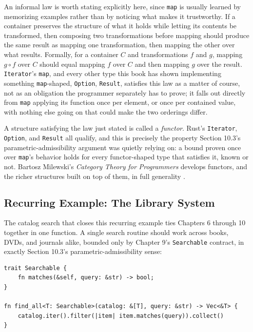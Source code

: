 \documentclass[11pt]{book}
\begin{document}
An informal law is worth stating explicitly here, since \texttt{map} is usually learned by memorizing examples rather than by noticing what makes it trustworthy. If a container preserves the structure of what it holds while letting its contents be transformed, then composing two transformations before mapping should produce the same result as mapping one transformation, then mapping the other over what results. Formally, for a container $C$ and transformations $f$ and $g$, mapping $g \circ f$ over $C$ should equal mapping $f$ over $C$ and then mapping $g$ over the result. \texttt{Iterator}'s \texttt{map}, and every other type this book has shown implementing something \texttt{map}-shaped, \texttt{Option}, \texttt{Result}, satisfies this law as a matter of course, not as an obligation the programmer separately has to prove; it falls out directly from \texttt{map} applying its function once per element, or once per contained value, with nothing else going on that could make the two orderings differ.

\begin{categorybox}
A structure satisfying the law just stated is called a \emph{functor}. Rust's \texttt{Iterator}, \texttt{Option}, and \texttt{Result} all qualify, and this is precisely the property Section 10.3's parametric-admissibility argument was quietly relying on: a bound proven once over \texttt{map}'s behavior holds for every functor-shaped type that satisfies it, known or not. Bartosz Milewski's \textit{Category Theory for Programmers} develops functors, and the richer structures built on top of them, in full generality \cite{milewski2019}.
\end{categorybox}

\subsection*{Recurring Example: The Library System}

The catalog search that closes this recurring example ties Chapters 6 through 10 together in one function. A single search routine should work across books, DVDs, and journals alike, bounded only by Chapter 9's \texttt{Searchable} contract, in exactly Section 10.3's parametric-admissibility sense:

\begin{lstlisting}
trait Searchable {
    fn matches(&self, query: &str) -> bool;
}

fn find_all<T: Searchable>(catalog: &[T], query: &str) -> Vec<&T> {
    catalog.iter().filter(|item| item.matches(query)).collect()
}
\end{lstlisting}
\end{document}

